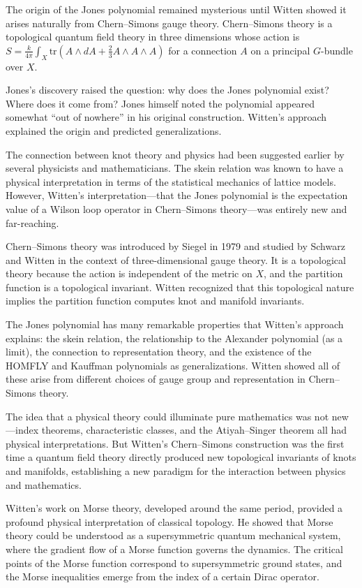 The origin of the Jones polynomial remained mysterious until Witten showed it arises naturally from Chern--Simons gauge theory. Chern--Simons theory is a topological quantum field theory in three dimensions whose action is $S = \frac{k}{4\pi}\int_X \text{tr}(A \wedge dA + \frac{2}{3}A \wedge A \wedge A)$ for a connection $A$ on a principal $G$-bundle over $X$.

Jones's discovery raised the question: why does the Jones polynomial exist? Where does it come from? Jones himself noted the polynomial appeared somewhat ``out of nowhere'' in his original construction. Witten's approach explained the origin and predicted generalizations.

The connection between knot theory and physics had been suggested earlier by several physicists and mathematicians. The skein relation was known to have a physical interpretation in terms of the statistical mechanics of lattice models. However, Witten's interpretation---that the Jones polynomial is the expectation value of a Wilson loop operator in Chern--Simons theory---was entirely new and far-reaching.

Chern--Simons theory was introduced by Siegel in 1979 and studied by Schwarz and Witten in the context of three-dimensional gauge theory. It is a topological theory because the action is independent of the metric on $X$, and the partition function is a topological invariant. Witten recognized that this topological nature implies the partition function computes knot and manifold invariants.

The Jones polynomial has many remarkable properties that Witten's approach explains: the skein relation, the relationship to the Alexander polynomial (as a limit), the connection to representation theory, and the existence of the HOMFLY and Kauffman polynomials as generalizations. Witten showed all of these arise from different choices of gauge group and representation in Chern--Simons theory.

The idea that a physical theory could illuminate pure mathematics was not new---index theorems, characteristic classes, and the Atiyah--Singer theorem all had physical interpretations. But Witten's Chern--Simons construction was the first time a quantum field theory directly produced new topological invariants of knots and manifolds, establishing a new paradigm for the interaction between physics and mathematics.

Witten's work on Morse theory, developed around the same period, provided a profound physical interpretation of classical topology. He showed that Morse theory could be understood as a supersymmetric quantum mechanical system, where the gradient flow of a Morse function governs the dynamics. The critical points of the Morse function correspond to supersymmetric ground states, and the Morse inequalities emerge from the index of a certain Dirac operator.

